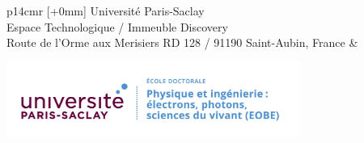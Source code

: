 \vspace{3cm} %
\selectfont
\begin{tabular}{p{14cm}r}
[+0mm]{{\color{Prune} Université Paris-Saclay\\
Espace Technologique / Immeuble Discovery\\
Route de l’Orme aux Merisiers RD 128 / 91190 Saint-Aubin, France}} & \\
\end{tabular}
\newpage
\noindent 
\includegraphics[height=2.45cm]{EOBE}
\vspace{1cm}
